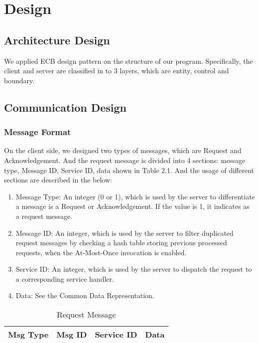 
\chapter{Design}
\begin{spacing}{1}
\setlength{\parskip}{0in}


\section{Architecture Design}

We applied ECB design pattern on the structure of our program. Specifically, the client and server are classified in to 3 layers, which are entity, control and boundary.

\section{Communication Design}
\subsection{Message Format}
On the client side, we designed two types of messages, which are Request and Acknowledgement. And the request message is divided into 4 sections: message type, Message ID, Service ID, data shown in Table 2.1. And the usage of different sections are described in the below:
\begin{enumerate}
  \item Message Type: An integer (0 or 1), which is used by the server to differentiate a message is a Request or Acknowledgement. If the value is 1, it indicates as a request message.
  \item Message ID: An integer, which is used by the server to filter duplicated request messages by checking a hash table storing previous processed requests, when the At-Most-Once invocation is enabled.
  \item Service ID: An integer, which is used by the server to dispatch the request to a corresponding service handler.
  \item Data: See the Common Data Representation.
\end{enumerate}
\begin{table}[h!]
\centering
\begin{tabular}{|l|l|l|l|}
\hline
Msg Type & Msg ID & Service ID & Data \\ \hline
\end{tabular}
\caption{Request Message}
\end{table}


\end{spacing}

